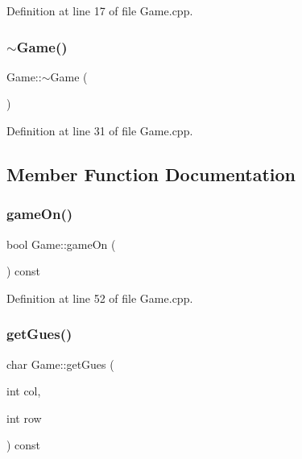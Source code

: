 Definition at line 17 of file Game.\+cpp.

\mbox{\label{class_game_ae3d112ca6e0e55150d2fdbc704474530}} 
\subsubsection{\texorpdfstring{$\sim$\+Game()}{~Game()}}
{\footnotesize\ttfamily Game\+::$\sim$\+Game (\begin{DoxyParamCaption}{ }\end{DoxyParamCaption})\hspace{0.3cm}{\ttfamily [virtual]}}



Definition at line 31 of file Game.\+cpp.



\subsection{Member Function Documentation}
\mbox{\label{class_game_a7ebb6acddd59f76be6b0888ca52295e6}} 
\subsubsection{\texorpdfstring{game\+On()}{gameOn()}}
{\footnotesize\ttfamily bool Game\+::game\+On (\begin{DoxyParamCaption}{ }\end{DoxyParamCaption}) const}



Definition at line 52 of file Game.\+cpp.

\mbox{\label{class_game_a20ad0b0ce0078dc48b500ea04807d8ab}} 
\subsubsection{\texorpdfstring{get\+Gues()}{getGues()}}
{\footnotesize\ttfamily char Game\+::get\+Gues (\begin{DoxyParamCaption}\item[{int}]{col,  }\item[{int}]{row }\end{DoxyParamCaption}) const}



